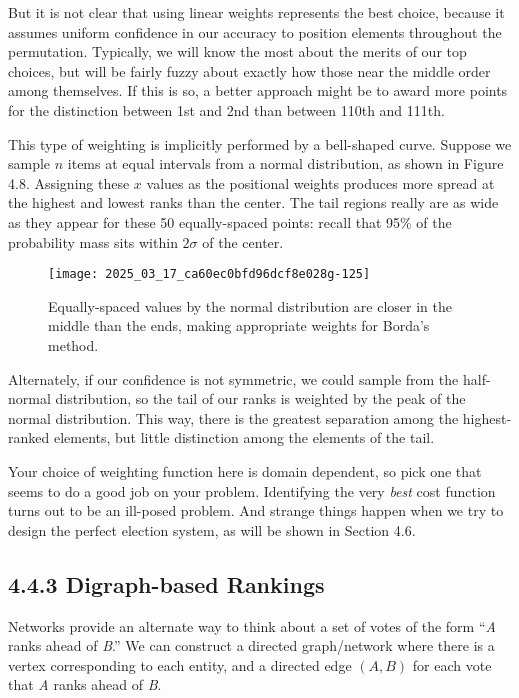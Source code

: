 \documentclass[10pt]{article}
\begin{document}
But it is not clear that using linear weights represents the best choice, because it assumes uniform confidence in our accuracy to position elements throughout the permutation. Typically, we will know the most about the merits of our top choices, but will be fairly fuzzy about exactly how those near the middle order among themselves. If this is so, a better approach might be to award more points for the distinction between 1st and 2nd than between 110th and 111th.

This type of weighting is implicitly performed by a bell-shaped curve. Suppose we sample \(n\) items at equal intervals from a normal distribution, as shown in Figure 4.8. Assigning these \(x\) values as the positional weights produces more spread at the highest and lowest ranks than the center. The tail regions really are as wide as they appear for these 50 equally-spaced points: recall that 95\% of the probability mass sits within \(2\sigma\) of the center.

\begin{figure}
    \centering
    \texttt{[image: 2025\_03\_17\_ca60ec0bfd96dcf8e028g-125]}
    \caption{Equally-spaced values by the normal distribution are closer in the middle than the ends, making appropriate weights for Borda’s method.}
\end{figure}

Alternately, if our confidence is not symmetric, we could sample from the half-normal distribution, so the tail of our ranks is weighted by the peak of the normal distribution. This way, there is the greatest separation among the highest-ranked elements, but little distinction among the elements of the tail.

Your choice of weighting function here is domain dependent, so pick one that seems to do a good job on your problem. Identifying the very \textit{best} cost function turns out to be an ill-posed problem. And strange things happen when we try to design the perfect election system, as will be shown in Section 4.6.

\subsection*{4.4.3 Digraph-based Rankings}
Networks provide an alternate way to think about a set of votes of the form “\textit{A} ranks ahead of \textit{B}.” We can construct a directed graph/network where there is a vertex corresponding to each entity, and a directed edge \((A, B)\) for each vote that \textit{A} ranks ahead of \textit{B}.
\end{document}
